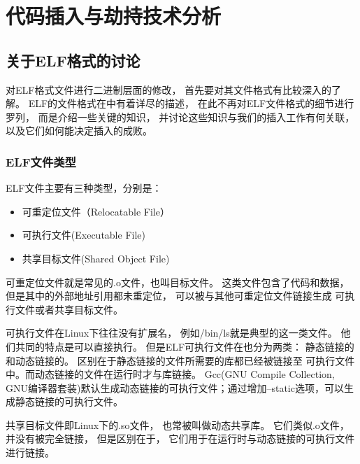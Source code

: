 \chapter{代码插入与劫持技术分析}








\section{关于ELF格式的讨论}

对ELF格式文件进行二进制层面的修改，
首先要对其文件格式有比较深入的了解。
ELF的文件格式在\cite{elf1.2}中有着详尽的描述，
在此不再对ELF文件格式的细节进行罗列，
而是介绍一些关键的知识，
并讨论这些知识与我们的插入工作有何关联，
以及它们如何能决定插入的成败。

  \subsection{ELF文件类型} 

ELF文件主要有三种类型，分别是：

\begin{itemize}
 \item 可重定位文件（Relocatable File）
 \item 可执行文件(Executable File)
 \item 共享目标文件(Shared Object File)
\end{itemize}

可重定位文件就是常见的.o文件，也叫目标文件。
这类文件包含了代码和数据，
但是其中的外部地址引用都未重定位，
可以被与其他可重定位文件链接生成
可执行文件或者共享目标文件。

可执行文件在Linux下往往没有扩展名，
例如/bin/ls就是典型的这一类文件。
他们共同的特点是可以直接执行。
但是ELF可执行文件在也分为两类：
静态链接的和动态链接的。
区别在于静态链接的文件所需要的库都已经被链接至
可执行文件中。而动态链接的文件在运行时才与库链接。
Gcc(GNU Compile Collection, GNU编译器套装)默认生成动态链接的可执行文件；通过增加--static选项，可以生成静态链接的可执行文件。

共享目标文件即Linux下的.so文件，
也常被叫做动态共享库。
它们类似.o文件，并没有被完全链接，
但是区别在于，
它们用于在运行时与动态链接的可执行文件进行链接。

